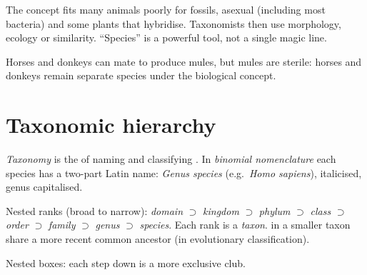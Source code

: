 \begin{remark}\label{rem:g10:biodiversity-classification:species-limits}
The concept fits many animals poorly for fossils, asexual 
(including most bacteria) and some plants that hybridise. Taxonomists
then use morphology, ecology or  similarity. ``Species'' is a powerful
tool, not a single magic line.
\end{remark}

\begin{example}\label{ex:g10:biodiversity-classification:mule}
Horses and donkeys can mate to produce mules, but mules are sterile:
horses and donkeys remain separate species under the biological concept.
\end{example}

\section{Taxonomic hierarchy}

\begin{definition}\label{def:g10:biodiversity-classification:taxonomy}
\emph{Taxonomy} is the  of naming and classifying
. In \emph{binomial nomenclature}
each species has a two-part Latin name: \emph{Genus species}
(e.g.\ \emph{Homo sapiens}), italicised, genus capitalised.
\end{definition}

\begin{definition}[Hierarchy]\label{def:g10:biodiversity-classification:hierarchy}
Nested ranks (broad to narrow):
\emph{domain} $\supset$
\emph{kingdom} $\supset$
\emph{phylum} $\supset$
\emph{class} $\supset$
\emph{order} $\supset$
\emph{family} $\supset$
\emph{genus} $\supset$
\emph{species}.
Each rank is a \emph{taxon}.  in a smaller taxon
share a more recent common ancestor (in evolutionary classification).
\end{definition}

\begin{omfigure}

{\small Nested boxes: each step down is a more exclusive club.}
\end{omfigure}

